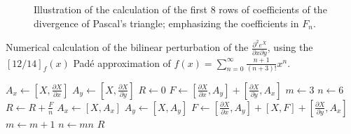\begin{figure}[!ht]
	\caption[Pascal's triangle divergence]{Illustration of the calculation of the first 8 rows of coefficients of the divergence of Pascal's triangle; emphasizing the coefficients in $F_n$.}
	\label{fig:pascaldivergence}
\end{figure}
\begin{algorithm}[!ht]
	\caption[Bilinear perturbation of $\frac{\partial^2 e^X}{\partial x \partial y}$]{Numerical calculation of the bilinear perturbation of the $\frac{\partial^2 e^X}{\partial x \partial y}$, using the $\left[ 12/14 \right]_f\left(x\right)$ Pad\'{e} approximation of $f\left(x\right)=\sum_{n=0}^\infty \frac{n+1}{\left(n+3\right)!} x^n$.}
	\label{alg:bilinear}
	\begin{algorithmic}[1]
			\State $A_x \gets \left[X,\frac{\partial X}{\partial x}\right]$
			\State $A_y \gets \left[X,\frac{\partial X}{\partial y}\right]$
			\State $R \gets 0$
			\State $F \gets \left[\frac{\partial X}{\partial x}, A_y\right] + \left[\frac{\partial X}{\partial y},A_x\right]$
			\State $m \gets 3$
			\State $n \gets 6$
				\State $R \gets R + \frac{F}{n}$
				\State $A_x \gets \left[X,A_x\right]$
				\State $A_y \gets \left[X,A_y\right]$
				\State $F \gets \left[\frac{\partial X}{\partial x}, A_y\right] + \left[X,F\right] + \left[\frac{\partial X}{\partial y},A_x\right]$
				\State $m \gets m+1$
				\State $n \gets m n$
			\EndWhile
			\State \Return $R$
		\EndFunction
	\end{algorithmic}
\end{algorithm}
